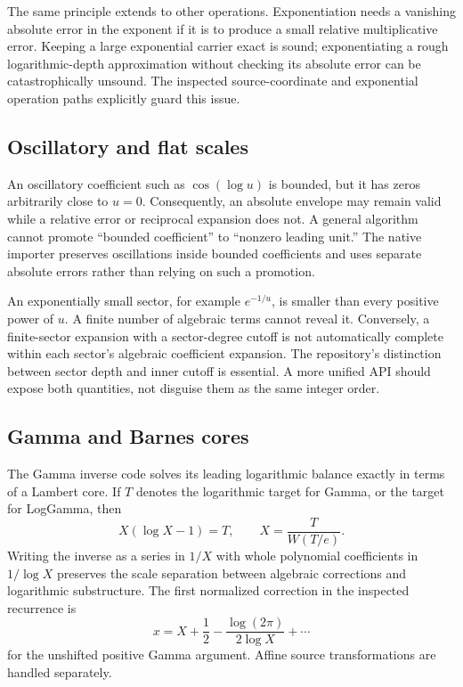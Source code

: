 \documentclass[11pt,a4paper]{article}
\theoremstyle{remark}\newtheorem{remark}[proposition]{Remark}
\begin{document}
The same principle extends to other operations. Exponentiation needs a vanishing absolute error in the exponent if it is to produce a small relative multiplicative error. Keeping a large exponential carrier exact is sound; exponentiating a rough logarithmic-depth approximation without checking its absolute error can be catastrophically unsound. The inspected source-coordinate and exponential operation paths explicitly guard this issue.\cite{operations,sourcecharts}

\subsection{Oscillatory and flat scales}
An oscillatory coefficient such as $\cos(\log u)$ is bounded, but it has zeros arbitrarily close to $u=0$. Consequently, an absolute envelope may remain valid while a relative error or reciprocal expansion does not. A general algorithm cannot promote ``bounded coefficient'' to ``nonzero leading unit.'' The native importer preserves oscillations inside bounded coefficients and uses separate absolute errors rather than relying on such a promotion.\cite{native}

An exponentially small sector, for example $e^{-1/u}$, is smaller than every positive power of $u$. A finite number of algebraic terms cannot reveal it. Conversely, a finite-sector expansion with a sector-degree cutoff is not automatically complete within each sector's algebraic coefficient expansion. The repository's distinction between sector depth and inner cutoff is essential. A more unified API should expose both quantities, not disguise them as the same integer order.\cite{guide,repoarticle}

\subsection{Gamma and Barnes cores}
The Gamma inverse code solves its leading logarithmic balance exactly in terms of a Lambert core. If $T$ denotes the logarithmic target for Gamma, or the target for LogGamma, then
\[
 X(\log X-1)=T,
 \qquad X=\frac{T}{W(T/e)}.
\]
Writing the inverse as a series in $1/X$ with whole polynomial coefficients in $1/\log X$ preserves the scale separation between algebraic corrections and logarithmic substructure. The first normalized correction in the inspected recurrence is
\[
 x=X+\frac12-\frac{\log(2\pi)}{2\log X}+\cdots
\]
for the unshifted positive Gamma argument. Affine source transformations are handled separately.\cite{gamma,dlmf-gamma}
\end{document}
